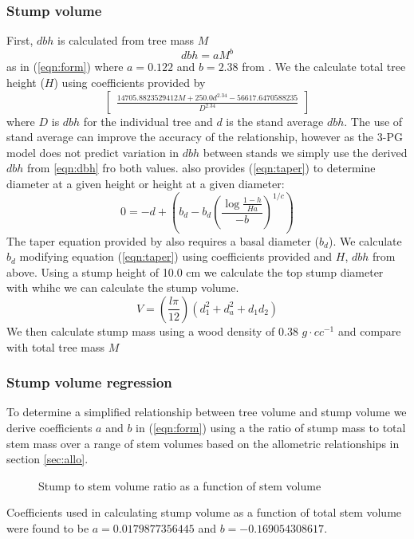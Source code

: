 \subsubsection*{Stump volume}
\label{sec:allo}
First, $dbh$ is calculated from tree mass $M$
\begin{equation}
    \label{eqn:dbh}
    dbh=aM^b
    \end{equation}as in (\ref{eqn:form}) where $a=0.122$ and $b=2.38$ from \cite{Landsberg1997}.
We the calculate total tree height ($H$) using coefficients provided by \cite{Brahim2000}
\begin{equation}
    \label{eqn:height}
    \begin{bmatrix}\frac{14705.8823529412 M + 250.0 d^{2.34} -56617.6470588235}{D^{2.34}}\end{bmatrix}
    \end{equation}where $D$ is $dbh$ for the individual tree and $d$ is the stand average $dbh$. The use of stand average can improve the accuracy of the relationship, however as the 3-PG model does not predict variation in $dbh$ between stands we simply use the derived $dbh$ from \ref{eqn:dbh} fro both values. \cite{Benbrahim2003} also provides (\ref{eqn:taper}) to determine diameter at a given height or height at a given diameter:
\begin{equation}
    \label{eqn:taper}
    0=-d+\left(b_d-b_d\left(\frac{\log{\frac{1-h}{Ha}}}{-b}\right)^{1/c}\right)
    \end{equation}The taper equation provided by \cite{Benbrahim2003} also requires a basal diameter ($b_d$). We calculate $b_d$ modifying equation (\ref{eqn:taper}) using coefficients provided and $H$, $dbh$ from above. Using a stump height of 10.0 cm we calculate the top stump diameter with whihc we can calculate the stump volume.
\begin{equation}
    \label{eqn:sectionvolume}
    V=\left(\frac{l\pi}{12}\right)(d_1^2+d_a^2+d_1d_2)
    \end{equation}We then calculate stump mass using a wood density of 0.38 $g \cdot cc^{-1}$ and compare with total tree mass $M$
\subsubsection*{Stump volume regression}
To determine a simplified relationship between tree volume and stump volume we derive coefficients $a$ and $b$ in (\ref{eqn:form}) using a the ratio of stump mass to total stem mass over a range of stem volumes based on the allometric relationships in section \ref{sec:allo}.\begin{figure}[h]
     \centering
    \caption{Stump to stem volume ratio as a function of stem volume}
    \label{fig:stump_vol}
    \end{figure}
Coefficients used in calculating stump volume as a function of total stem volume were found to be $a=0.0179877356445$ and $b=-0.169054308617$.